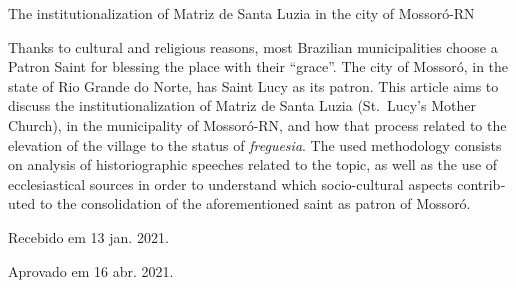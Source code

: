 \begin{refsection}
    
    \begin{otherlanguage}{english}
    
    \fakeChapterOneLine
    {The institutionalization of Matriz de Santa Luzia in the city of Mossoró-RN}

    \begin{galoResumo}[Abstract]
        Thanks to cultural and religious reasons, most Brazilian municipalities choose a Patron Saint for blessing the place with their ``grace''. The city of Mossoró, in the state of Rio Grande do Norte, has Saint Lucy as its patron. This article aims to discuss the institutionalization of Matriz de Santa Luzia (St.~Lucy's Mother Church), in the municipality of Mossoró-RN, and how that process related to the elevation of the village to the status of \textit{freguesia}. The used methodology consists on analysis of historiographic speeches related to the topic, as well as the use of ecclesiastical sources in order to understand which socio-cultural aspects contributed to the consolidation of the aforementioned saint as patron of Mossoró.
    \end{galoResumo}
    
    \end{otherlanguage}

    \printbibliography[heading=subbibliography,notcategory=fullcited]

    \hfill Recebido em 13 jan. 2021.

    \hfill Aprovado em 16 abr. 2021.

    \label{chap:institucionalizacaoend}

\end{refsection}
